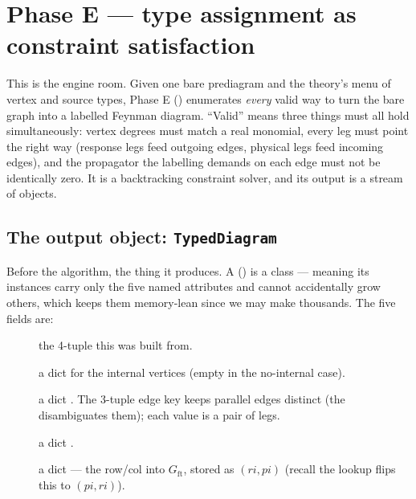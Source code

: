 \section{Phase E --- type assignment as constraint satisfaction}\label{sec:ta-typeassign}

This is the engine room. Given one bare prediagram and the theory's menu of
vertex and source types, Phase E
() enumerates \emph{every} valid way to
turn the bare graph into a labelled Feynman diagram. ``Valid'' means three things
must all hold simultaneously: vertex degrees must match a real monomial, every
leg must point the right way (response legs feed outgoing edges, physical legs
feed incoming edges), and the propagator the labelling demands on each edge must
not be identically zero. It is a backtracking constraint solver, and its output
is a stream of  objects.

\subsection{The output object: \texttt{TypedDiagram}}

Before the algorithm, the thing it produces. A 
() is a  class --- meaning
its instances carry only the five named attributes and cannot accidentally grow
others, which keeps them memory-lean since we may make thousands. The five
fields are:

\begin{description}
  \item[] the  4-tuple this was
        built from.
  \item[] a dict
         for the internal vertices
        (empty in the no-internal case).
  \item[] a dict
        . The 3-tuple edge key
        keeps parallel edges distinct (the  disambiguates them); each
        value is a pair of  legs.
  \item[] a dict
        .
  \item[] a dict
         --- the row/col into
        $G_{\mathrm{ft}}$, stored as $(ri, pi)$ (recall the lookup flips this to
        $(pi, ri)$).
\end{description}

